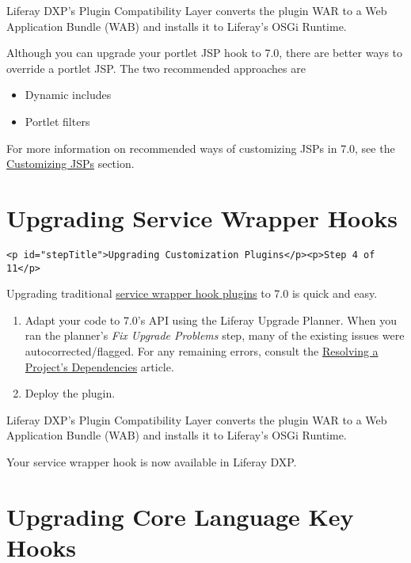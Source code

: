 Liferay DXP's Plugin Compatibility Layer converts the plugin WAR to a
Web Application Bundle (WAB) and installs it to Liferay's OSGi Runtime.

Although you can upgrade your portlet JSP hook to 7.0, there are better
ways to override a portlet JSP. The two recommended approaches are

\begin{itemize}
\tightlist
\item
  Dynamic includes
\item
  Portlet filters
\end{itemize}

For more information on recommended ways of customizing JSPs in 7.0, see
the
\href{/docs/7-2/customization/-/knowledge_base/c/customizing-jsps}{Customizing
JSPs} section.

\chapter{Upgrading Service Wrapper
Hooks}\label{upgrading-service-wrapper-hooks}

\begin{verbatim}
<p id="stepTitle">Upgrading Customization Plugins</p><p>Step 4 of 11</p> 
\end{verbatim}

Upgrading traditional
\href{/docs/6-2/tutorials/-/knowledge_base/t/overriding-a-portal-service-using-a-hook}{service
wrapper hook plugins} to 7.0 is quick and easy.

\begin{enumerate}
\def\labelenumi{\arabic{enumi}.}
\item
  Adapt your code to 7.0's API using the Liferay Upgrade Planner. When
  you ran the planner's \emph{Fix Upgrade Problems} step, many of the
  existing issues were autocorrected/flagged. For any remaining errors,
  consult the
  \href{/docs/7-2/tutorials/-/knowledge_base/t/resolving-a-projects-dependencies}{Resolving
  a Project's Dependencies} article.
\item
  Deploy the plugin.
\end{enumerate}

Liferay DXP's Plugin Compatibility Layer converts the plugin WAR to a
Web Application Bundle (WAB) and installs it to Liferay's OSGi Runtime.

Your service wrapper hook is now available in Liferay DXP.

\chapter{Upgrading Core Language Key
Hooks}\label{upgrading-core-language-key-hooks}

